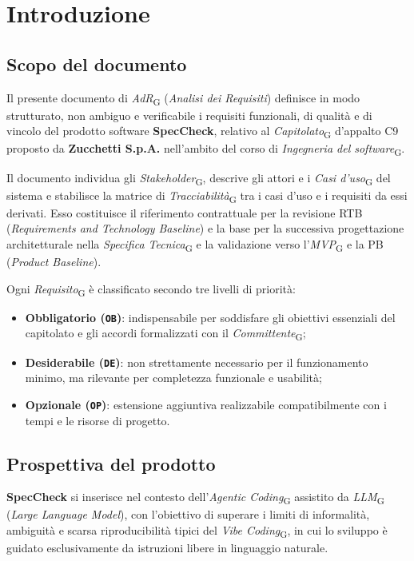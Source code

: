 \documentclass[11pt, a4paper]{article}
\newcommand{\glossario}[1]{\textit{#1}\textsubscript{G}}
\begin{document}
\newpage
\tableofcontents
\newpage
\listoffigures
\listoftables
\newpage

\section{Introduzione}

\subsection{Scopo del documento}
Il presente documento di \glossario{AdR} (\textit{Analisi dei Requisiti}) definisce in modo strutturato, non ambiguo e verificabile i requisiti funzionali, di qualità e di vincolo del prodotto software \textbf{SpecCheck}, relativo al \glossario{Capitolato} d'appalto C9 proposto da \textbf{Zucchetti S.p.A.} nell'ambito del corso di \glossario{Ingegneria del software}.

Il documento individua gli \glossario{Stakeholder}, descrive gli attori e i \glossario{Casi d'uso} del sistema e stabilisce la matrice di \glossario{Tracciabilità} tra i casi d'uso e i requisiti da essi derivati. Esso costituisce il riferimento contrattuale per la revisione RTB (\textit{Requirements and Technology Baseline}) e la base per la successiva progettazione architetturale nella \glossario{Specifica Tecnica} e la validazione verso l'\glossario{MVP} e la PB (\textit{Product Baseline}).

Ogni \glossario{Requisito} è classificato secondo tre livelli di priorità:
\begin{itemize}
    \item \textbf{Obbligatorio (\texttt{OB})}: indispensabile per soddisfare gli obiettivi essenziali del capitolato e gli accordi formalizzati con il \glossario{Committente};
    \item \textbf{Desiderabile (\texttt{DE})}: non strettamente necessario per il funzionamento minimo, ma rilevante per completezza funzionale e usabilità;
    \item \textbf{Opzionale (\texttt{OP})}: estensione aggiuntiva realizzabile compatibilmente con i tempi e le risorse di progetto.
\end{itemize}

\subsection{Prospettiva del prodotto}
\textbf{SpecCheck} si inserisce nel contesto dell'\glossario{Agentic Coding} assistito da \glossario{LLM} (\textit{Large Language Model}), con l'obiettivo di superare i limiti di informalità, ambiguità e scarsa riproducibilità tipici del \glossario{Vibe Coding}, in cui lo sviluppo è guidato esclusivamente da istruzioni libere in linguaggio naturale.
\end{document}
